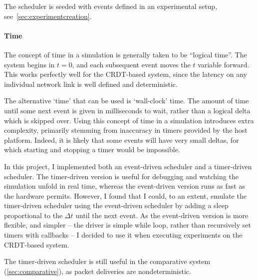\documentclass[12pt,a4paper,twoside,openright]{report}
\begin{document}
		The scheduler is seeded with events defined in an experimental setup, see~\cref{sec:experimentcreation}.
		
		\paragraph{Time} \label{sec:rtscheduler}
		The concept of time in a simulation is generally taken to be ``logical time''. The system begins in $t = 0$, and each subsequent event moves the $t$ variable forward. This works perfectly well for the CRDT-based system, since the latency on any individual network link is well defined and deterministic.
		
		The alternative `time' that can be used is `wall-clock' time. The amount of time until some next event is given in milliseconds to wait, rather than a logical delta which is skipped over. Using this concept of time in a simulation introduces extra complexity, primarily stemming from inaccuracy in timers provided by the host platform. Indeed, it is likely that some events will have very small deltas, for which starting and stopping a timer would be impossible. 
		
		In this project, I implemented both an event-driven scheduler and a timer-driven scheduler. The timer-driven version is useful for debugging and watching the simulation unfold in real time, whereas the event-driven version runs as fast as the hardware permits. However, I found that I could, to an extent, emulate the timer-driven scheduler using the event-driven scheduler by adding a sleep proportional to the $\Delta t$ until the next event. As the event-driven version is more flexible, and simpler -- the driver is simple while loop, rather than recursively set timers with callbacks -- I decided to use it when executing experiments on the CRDT-based system.
		
		The timer-driven scheduler is still useful in the comparative system (\cref{sec:comparative}), as packet deliveries are nondeterministic.
		
\end{document}
